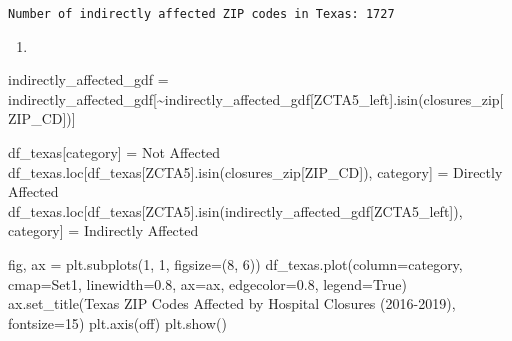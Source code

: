 \documentclass[
  letterpaper,
  DIV=11,
  numbers=noendperiod]{scrartcl}
\newenvironment{Shaded}{\begin{snugshade}}{\end{snugshade}}
\newcommand{\DecValTok}[1]{\textcolor[rgb]{0.68,0.00,0.00}{#1}}
\newcommand{\FloatTok}[1]{\textcolor[rgb]{0.68,0.00,0.00}{#1}}
\newcommand{\NormalTok}[1]{\textcolor[rgb]{0.00,0.23,0.31}{#1}}
\newcommand{\OperatorTok}[1]{\textcolor[rgb]{0.37,0.37,0.37}{#1}}
\newcommand{\StringTok}[1]{\textcolor[rgb]{0.13,0.47,0.30}{#1}}
\newcommand{\VariableTok}[1]{\textcolor[rgb]{0.07,0.07,0.07}{#1}}
\providecommand{\tightlist}{%
  \setlength{\itemsep}{0pt}\setlength{\parskip}{0pt}}\usepackage{longtable,booktabs,array}
\begin{document}
\begin{verbatim}
Number of indirectly affected ZIP codes in Texas: 1727
\end{verbatim}

\begin{enumerate}
\def\labelenumi{\arabic{enumi}.}
\setcounter{enumi}{3}
\tightlist
\item
\end{enumerate}

\begin{Shaded}
\begin{Highlighting}[]
\NormalTok{indirectly\_affected\_gdf }\OperatorTok{=}\NormalTok{ indirectly\_affected\_gdf[}\OperatorTok{\textasciitilde{}}\NormalTok{indirectly\_affected\_gdf[}\StringTok{\textquotesingle{}ZCTA5\_left\textquotesingle{}}\NormalTok{].isin(closures\_zip[}\StringTok{\textquotesingle{}ZIP\_CD\textquotesingle{}}\NormalTok{])]}

\NormalTok{df\_texas[}\StringTok{\textquotesingle{}category\textquotesingle{}}\NormalTok{] }\OperatorTok{=} \StringTok{\textquotesingle{}Not Affected\textquotesingle{}}
\NormalTok{df\_texas.loc[df\_texas[}\StringTok{\textquotesingle{}ZCTA5\textquotesingle{}}\NormalTok{].isin(closures\_zip[}\StringTok{\textquotesingle{}ZIP\_CD\textquotesingle{}}\NormalTok{]), }\StringTok{\textquotesingle{}category\textquotesingle{}}\NormalTok{] }\OperatorTok{=} \StringTok{\textquotesingle{}Directly Affected\textquotesingle{}}
\NormalTok{df\_texas.loc[df\_texas[}\StringTok{\textquotesingle{}ZCTA5\textquotesingle{}}\NormalTok{].isin(indirectly\_affected\_gdf[}\StringTok{\textquotesingle{}ZCTA5\_left\textquotesingle{}}\NormalTok{]), }\StringTok{\textquotesingle{}category\textquotesingle{}}\NormalTok{] }\OperatorTok{=} \StringTok{\textquotesingle{}Indirectly Affected\textquotesingle{}}

\NormalTok{fig, ax }\OperatorTok{=}\NormalTok{ plt.subplots(}\DecValTok{1}\NormalTok{, }\DecValTok{1}\NormalTok{, figsize}\OperatorTok{=}\NormalTok{(}\DecValTok{8}\NormalTok{, }\DecValTok{6}\NormalTok{))}
\NormalTok{df\_texas.plot(column}\OperatorTok{=}\StringTok{\textquotesingle{}category\textquotesingle{}}\NormalTok{, cmap}\OperatorTok{=}\StringTok{\textquotesingle{}Set1\textquotesingle{}}\NormalTok{, linewidth}\OperatorTok{=}\FloatTok{0.8}\NormalTok{, ax}\OperatorTok{=}\NormalTok{ax, edgecolor}\OperatorTok{=}\StringTok{\textquotesingle{}0.8\textquotesingle{}}\NormalTok{, legend}\OperatorTok{=}\VariableTok{True}\NormalTok{)}
\NormalTok{ax.set\_title(}\StringTok{\textquotesingle{}Texas ZIP Codes Affected by Hospital Closures (2016{-}2019)\textquotesingle{}}\NormalTok{, fontsize}\OperatorTok{=}\DecValTok{15}\NormalTok{)}
\NormalTok{plt.axis(}\StringTok{\textquotesingle{}off\textquotesingle{}}\NormalTok{)}
\NormalTok{plt.show()}


\end{Highlighting}
\end{Shaded}
\end{document}
